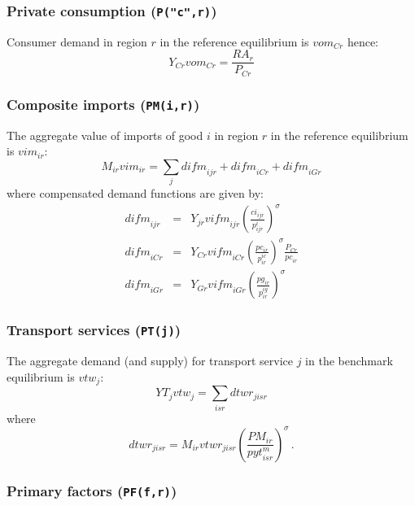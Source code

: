 \subsubsection[Private consumption]{Private
consumption (\texttt{P("c",r)})}

Consumer demand in region $r$ in the reference equilibrium is
$\textit{vom}_{Cr}$  hence:
\begin{equation}
Y_{Cr} \textit{vom}_{Cr}  = \frac{\textit{RA}_r}{P_{Cr}}
\end{equation}

\subsubsection[Composite imports]{Composite imports (\texttt{PM(i,r)})}

The aggregate value of imports of good $i$ in region $r$ in the
reference equilibrium is $\textit{vim}_{ir}$:
\begin{equation}
M_{ir} \textit{vim}_{ir} = \sum_j \textit{difm}_{ijr} +
\textit{difm}_{iCr} + \textit{difm}_{iGr}
\end{equation}
where compensated demand functions are given by:
\begin{eqnarray}
\textit{difm}_{ijr} &=& Y_{jr} \textit{vifm}_{ijr} \left( \frac{ci_{ijr}}{p^i_{ijr}} \right)^\sigma\nonumber\\
\textit{difm}_{iCr} &=& Y_{Cr} \textit{vifm}_{iCr}  \left(\frac{pc_{ir}}{p^{ic}_{ir}}\right)^\sigma  \frac{P_{Cr}}{\textit{pc}_{ir}} \nonumber\\
\textit{difm}_{iGr} &=& Y_{Gr} \textit{vifm}_{iGr} \left(\frac{pg_{ir}}{p^{ig}_{ir}}\right)^\sigma \nonumber
\end{eqnarray}

\subsubsection[Transport services]{Transport services (\texttt{PT(j)})}

The aggregate demand (and supply) for transport service $j$ in the
benchmark equilibrium is $\textit{vtw}_j$:
\begin{equation}
\textit{YT}_j  \textit{vtw}_j = \sum_{isr} \textit{dtwr}_{jisr}
\end{equation}
where
$$\textit{dtwr}_{jisr} = M_{ir} \textit{vtwr}_{jisr}  \left(
\frac{\mathit{PM}_{ir}}{\textit{pyt}^m_{isr}} \right)^\sigma\,.$$

\subsubsection[Primary factors]{Primary factors (\texttt{PF(f,r)})}

